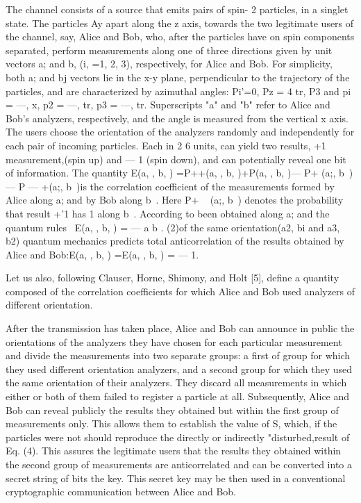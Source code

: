 The channel consists of a source that emits pairs of spin- 2 particles, in a singlet state. The particles Ay apart along the z axis, towards the two legitimate users of the channel, say, Alice and Bob, who, after the particles have on spin components separated, perform measurements along one of three directions given by unit vectors a; and b, (i, =1, 2, 3), respectively, for Alice and Bob. For simplicity, both a; and bj vectors lie in the x-y plane, perpendicular to the trajectory of the particles, and are characterized by azimuthal angles: Pi'=0, Pz = 4 tr, P3 and pi = —, x, p2 = —, tr, p3 = —, tr. Superscripts "a" and "b" refer to Alice and Bob's analyzers, respectively, and the angle is measured from the vertical x axis. The users choose the orientation of the analyzers randomly and independently for each pair of incoming particles. Each in 2 6 units, can yield two results, +1 measurement,(spin up) and — 1 (spin down), and can potentially reveal one bit of information.
The quantity E(a, , b, ) =P++(a, , b, )+P(a, , b, )— P+ (a;, b~) — P — +(a;, b~)is the correlation coefficient of the measurements formed by Alice along a; and by Bob along b~. Here P+ ~ (a;, b~) denotes the probability that result +'1 has 1 along b~. According to been obtained along a; and the quantum rules~ E(a, , b, ) = — a b . (2)of the same orientation(a2, bi and a3, b2) quantum mechanics predicts total anticorrelation of the results obtained by Alice and Bob:E(a, , b, ) =E(a, , b, ) = — 1.

Let us also, following Clauser, Horne, Shimony, and Holt [5], define a quantity composed of the correlation coefficients for which Alice and Bob used analyzers of different orientation.

After the transmission has taken place, Alice and Bob can announce in public the orientations of the analyzers they have chosen for each particular measurement and divide the measurements into two separate groups: a first of group for which they used different orientation analyzers, and a second group for which they used the same orientation of their analyzers. They discard all measurements in which either or both of them failed to register a particle at all. Subsequently, Alice and Bob can reveal publicly the results they obtained but within the first group of measurements only. This allows them to establish the value of S, which, if the particles were not should reproduce the directly or indirectly "disturbed,result of Eq. (4). This assures the legitimate users that the results they obtained within the second group of measurements are anticorrelated and can be converted into a secret string of bits the key. This secret key may be then used in a conventional cryptographic communication between Alice and Bob.

